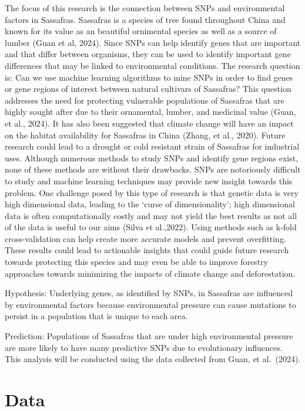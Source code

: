 \documentclass[
]{article}
\begin{document}
The focus of this research is the connection between SNPs and
environmental factors in Sassafras. Sassafras is a species of tree found
throughout China and known for its value as an beautiful ornimental
species as well as a source of lumber (Guan et al, 2024). Since SNPs can
help identify genes that are important and that differ between
organisms, they can be used to identify important gene differences that
may be linked to environmental conditions. The research question is: Can
we use machine learning algorithms to mine SNPs in order to find genes
or gene regions of interest between natural cultivars of Sassafras? This
question addresses the need for protecting vulnerable populations of
Sassafras that are highly sought after due to their ornamental, lumber,
and medicinal value (Guan, et al., 2024). It has also been suggested
that climate change will have an impact on the habitat availability for
Sassafras in China (Zhang, et al., 2020). Future research could lead to
a drought or cold resistant strain of Sassafras for industrial uses.
Although numerous methods to study SNPs and identify gene regions exist,
none of these methods are without their drawbacks. SNPs are notoriously
difficult to study and machine learning techniques may provide new
insight towards this problem. One challenge posed by this type of
research is that genetic data is very high dimensional data, leading to
the `curse of dimensionality'; high dimensional data is often
computationally costly and may not yield the best results as not all of
the data is useful to our aims (Silva et al.,2022). Using methods such
as k-fold cross-validation can help create more accurate models and
prevent overfitting. These results could lead to actionable insights
that could guide future research towards protecting this species and may
even be able to improve forestry approaches towards minimizing the
impacts of climate change and deforestation.

Hypothesis: Underlying genes, as identified by SNPs, in Sassafras are
influenced by environmental factors because environmental pressure can
cause mutations to persist in a population that is unique to each area.

Prediction: Populations of Sassafras that are under high environmental
pressure are more likely to have many predictive SNPs due to
evolutionary influences. This analysis will be conducted using the data
collected from Guan, et al.~(2024).

\section{Data}\label{data}
\end{document}
